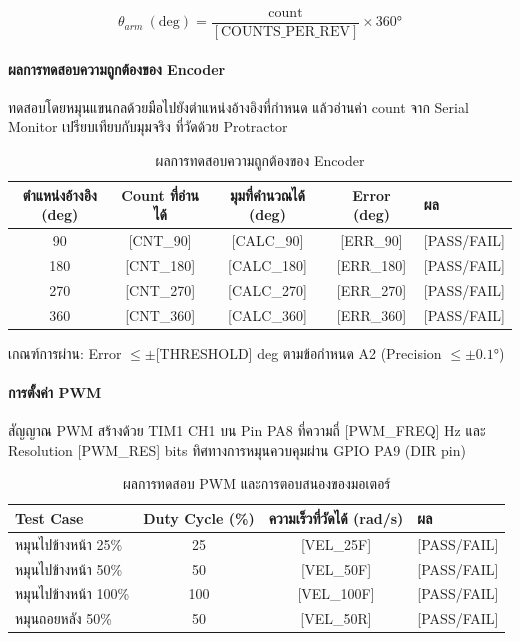 \begin{equation}
  \theta_{arm}\ (\text{deg})
  = \frac{\text{count}}{[\text{COUNTS\_PER\_REV}]} \times 360°
\end{equation}

\paragraph{ผลการทดสอบความถูกต้องของ Encoder}

ทดสอบโดยหมุนแขนกลด้วยมือไปยังตำแหน่งอ้างอิงที่กำหนด
แล้วอ่านค่า count จาก Serial Monitor เปรียบเทียบกับมุมจริง
ที่วัดด้วย Protractor

\begin{table}[H]
  \centering
  \caption{ผลการทดสอบความถูกต้องของ Encoder}
  \label{tab:encoder_test}
  \begin{tabular}{ccccl}
    \toprule
    ตำแหน่งอ้างอิง (deg)
      & Count ที่อ่านได้
      & มุมที่คำนวณได้ (deg)
      & Error (deg)
      & ผล \\
    \midrule
    90  & [CNT\_90]  & [CALC\_90]  & [ERR\_90]  & [PASS/FAIL] \\
    180 & [CNT\_180] & [CALC\_180] & [ERR\_180] & [PASS/FAIL] \\
    270 & [CNT\_270] & [CALC\_270] & [ERR\_270] & [PASS/FAIL] \\
    360 & [CNT\_360] & [CALC\_360] & [ERR\_360] & [PASS/FAIL] \\
    \bottomrule
  \end{tabular}
\end{table}

เกณฑ์การผ่าน: Error $\leq \pm$[THRESHOLD] deg
ตามข้อกำหนด A2 (Precision $\leq \pm 0.1°$)

\paragraph{การตั้งค่า PWM}

สัญญาณ PWM สร้างด้วย TIM1 CH1 บน Pin PA8
ที่ความถี่ [PWM\_FREQ] Hz และ Resolution [PWM\_RES] bits
ทิศทางการหมุนควบคุมผ่าน GPIO PA9 (DIR pin)

\begin{table}[H]
  \centering
  \caption{ผลการทดสอบ PWM และการตอบสนองของมอเตอร์}
  \label{tab:pwm_test}
  \begin{tabular}{lccl}
    \toprule
    Test Case
      & Duty Cycle (\%)
      & ความเร็วที่วัดได้ (rad/s)
      & ผล \\
    \midrule
    หมุนไปข้างหน้า 25\%  & 25  & [VEL\_25F]  & [PASS/FAIL] \\
    หมุนไปข้างหน้า 50\%  & 50  & [VEL\_50F]  & [PASS/FAIL] \\
    หมุนไปข้างหน้า 100\% & 100 & [VEL\_100F] & [PASS/FAIL] \\
    หมุนถอยหลัง 50\%     & 50  & [VEL\_50R]  & [PASS/FAIL] \\
    \bottomrule
  \end{tabular}
\end{table}

